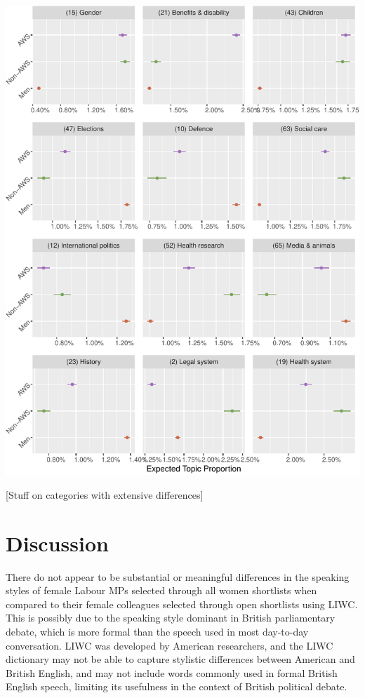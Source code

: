 \documentclass[]{article}
\let\origfigure\figure
\let\endorigfigure\endfigure
\renewenvironment{figure}[1][2] {
    \expandafter\origfigure\expandafter[H]
} {
    \endorigfigure
}
\theoremstyle{definition}
\theoremstyle{definition}
\theoremstyle{definition}
\theoremstyle{remark}
\begin{document}
\begin{figure}
\centering
\includegraphics{methodology_files/figure-latex/p-effect-cv-1.pdf}
\caption{\label{fig:p-effect-cv}Topics with the greatest frequency
coefficient of variation}
\end{figure}

{[}Stuff on categories with extensive differences{]}

\hypertarget{discussion}{%
\section{Discussion}\label{discussion}}

There do not appear to be substantial or meaningful differences in the
speaking styles of female Labour MPs selected through all women
shortlists when compared to their female colleagues selected through
open shortlists using LIWC. This is possibly due to the speaking style
dominant in British parliamentary debate, which is more formal than the
speech used in most day-to-day conversation. LIWC was developed by
American researchers, and the LIWC dictionary may not be able to capture
stylistic differences between American and British English, and may not
include words commonly used in formal British English speech, limiting
its usefulness in the context of British political debate.
\end{document}
